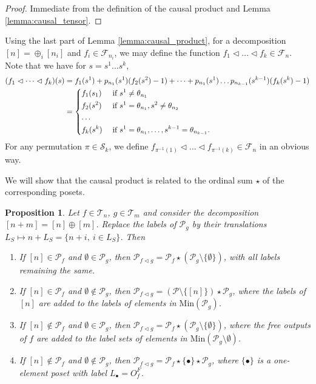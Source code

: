 \documentclass[12pt]{article}
\newtheorem{prop}{Proposition}
\theoremstyle{definition}
\theoremstyle{remark}
\def\Te{\mathcal T}
\def\Fe{\mathcal F}
\def\Pe{\mathcal P}
\def\permut{\mathscr{S}}
\def\vtl{\vartriangleleft}
\begin{document}
\begin{proof}
Immediate from the definition of the causal product and Lemma \ref{lemma:causal_tensor}.

\end{proof}







Using the last part of Lemma \ref{lemma:causal_product},
for a decomposition $[n]=\oplus_i[n_i]$ and $f_i\in \Fe_{n_i}$,  we may define the function $f_1\vtl\dots \vtl f_k\in
\Fe_{n}$. Note that we have for $s=s^1\dots s^k$, 
\begin{align*}
(f_1\vtl \dots\vtl f_k)(s)&=f_1(s^1)+p_{n_1}(s^1)(f_2(s^2)-1)+\dots + p_{n_1}(s^1)\dots
p_{n_{k-1}}(s^{k-1})(f_k(s^k)-1)\\
&= \begin{dcases} f_1(s_1) & \text{ if } s^1\ne \theta_{n_1}\\
f_2(s^2) & \text{ if } s^1=\theta_{n_1}, s^2\ne \theta_{n_2}\\
\dots & \\
f_k(s^k) & \text{ if } s^1=\theta_{n_1},\dots,  s^{k-1}=\theta_{n_{k-1}}.
\end{dcases}
\end{align*}
For any permutation $\pi\in \permut_k$, we define  $f_{\pi^{-1}(1)}\vtl \dots \vtl
f_{\pi^{-1}(k)}\in \Fe_n$ in an obvious way.


We will show that the causal product is related to the ordinal sum $\star$ of the corresponding
posets.

\begin{prop}\label{prop:vtl_ordinal} Let $f\in \Te_{n}$, $g\in \Te_{m}$
and
consider the decomposition $[n+m]=[n]\oplus[m]$. Replace the labels of $\Pe_g$ by their
translations $L_S\mapsto n+L_S=\{n+i,\ i\in L_S\}$.
Then  
\begin{enumerate}
\item[(a)] If $[n]\in \Pe_f$ and $\emptyset \in \Pe_g$, then $\Pe_{f\vtl g}=\Pe_f\star
(\Pe_g\setminus\{\emptyset\})$, with all labels remaining the same.
\item[(b)] If $[n]\in \Pe_f$ and $\emptyset \notin \Pe_g$, then $\Pe_{f\vtl
g}=(\Pe\setminus \{[n]\})\star \Pe_g$, where the labels of $[n]$ are added to the
labels of elements in $\mathrm{Min}(\Pe_g)$.
\item[(c)] If $[n]\notin \Pe_f$ and $\emptyset \in \Pe_g$, then $\Pe_{f\vtl g}=\Pe_f\star
(\Pe_g\setminus\{\emptyset\})$, where the free outputs  of $f$ are added to the label sets
of elements in $\mathrm{Min}(\Pe_g\setminus \emptyset)$.
\item[(d)] If $[n]\notin \Pe_f$ and $\emptyset \notin \Pe_g$, then $\Pe_{f\vtl
g}=\Pe_f\star \{\bullet\}\star \Pe_g$, where $\{\bullet\}$ is a one-element poset with
label $L_\bullet=O_f^F$.

\end{enumerate}

\end{prop}
\end{document}
